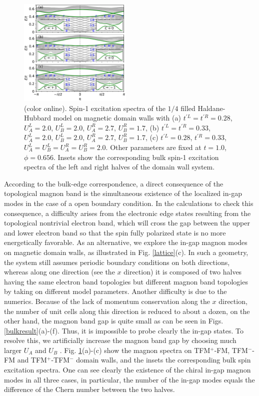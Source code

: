 \documentclass[amsmath,superscriptaddress,showpacs,aps,prl,twocolumn]{revtex4-1}
\begin{document}
\begin{figure}
\centering
\includegraphics[width=0.48\textwidth]{domainwallspectra}
\caption{(color online). Spin-1 excitation spectra of the $1/4$ filled Haldane-Hubbard model on magnetic domain walls with (a) $t^{\prime L}=t^{\prime R}=0.28$, $U^L_A=2.0$, $U^L_B=2.0$, $U^R_A=2.7$, $U^R_B=1.7$, (b) $t^{\prime L}=t^{\prime R}=0.33$, $U^L_A=2.0$, $U^L_B=2.0$, $U^R_A=2.7$, $U^R_B=1.7$, (c) $t^{\prime L}=0.28$, $t^{\prime R}=0.33$, $U^L_A=U^L_B=U^R_A=U^R_B=2.0$. Other parameters are fixed at $t=1.0$, $
\phi=0.656$. Insets show the corresponding bulk spin-1 excitation spectra of the left and right halves of the domain wall system.}
\label{domainwallspectra}
\end{figure}

\par According to the bulk-edge correspondence, a direct consequence of the topological magnon band is the simultaneous existence of the localized in-gap modes in the case of a open boundary condition. In the calculations to check this consequence, a difficulty arises from the electronic edge states resulting from the topological nontrivial electron band, which will cross the gap between the upper and lower electron band so that the spin fully polarized state is no more energetically favorable. As an alternative, we explore the in-gap magnon modes on magnetic domain walls, as illustrated in Fig. \ref{lattice}(c). In such a geometry, the system still assumes periodic boundary conditions on both directions, whereas along one direction (see the $x$ direction) it is composed of two halves having the same electron band topologies but different magnon band topologies by taking on different model parameters. Another difficulty is due to the numerics. Because of the lack of momentum conservation along the $x$ direction, the number of unit cells along this direction is reduced to about a dozen, on the other hand, the magnon band gap is quite small as can be seen in Figs. \ref{bulkresult}(a)-(f). Thus, it is impossible to probe clearly the in-gap states. To resolve this, we artificially increase the magnon band gap by choosing much larger $U_A$ and $U_B$ \cite{gap}. Fig. \ref{domainwallspectra}(a)-(c) show the magnon spectra on TFM$^+$-FM, TFM$^-$-FM and TFM$^+$-TFM$^-$ domain walls, and the insets the corresponding bulk spin excitation spectra. One can see clearly the existence of the chiral in-gap magnon modes in all three cases, in particular, the number of the in-gap modes equals the difference of the Chern number between the two halves.
\end{document}
